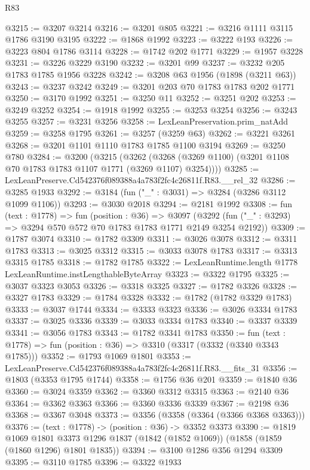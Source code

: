 \begin{lexlean}{R83}
\begin{coremodule}
@3215 := @3207 @3214
@3216 := @3201 @805
@3221 := @3216 @1111 @3115 @1786 @3190 @3195
@3222 := @1868 @1992
@3223 := @3222 @193
@3226 := @3223 @804 @1786 @3114
@3228 := @1742 @202 @1771
@3229 := @1957 @3228
@3231 := @3226 @3229 @3190
@3232 := @3201 @99
@3237 := @3232 @205 @1783 @1785 @1956 @3228
@3242 := @3208 @63 @1956 (@1898 (@3211 @63))
@3243 := @3237 @3242
@3249 := @3201 @203 @70 @1783 @1783 @202 @1771
@3250 := @3170 @1992
@3251 := @3250 @11
@3252 := @3251 @202
@3253 := @3249 @3252
@3254 := @1918 @1992
@3255 := @3253 @3254
@3256 := @3243 @3255
@3257 := @3231 @3256
@3258 := LexLeanPreservation.prim_natAdd
@3259 := @3258 @1795
@3261 := @3257 (@3259 @63)
@3262 := @3221 @3261
@3268 := @3201 @1101 @1110 @1783 @1785 @1100 @3194
@3269 := @3250 @780
@3284 := @3200
    (@3215
      (@3262 (@3268 (@3269 @1100) (@3201 @1108 @70 @1783 @1783 @1107 @1771 (@3269 @1107) @3254))))
@3285 := LexLeanPreserve.Cd542376f089388a4a783f2fc4c26811f.R83.__rel_32
@3286 := @3285 @1933
@3292 := @3184 (fun ("_" : @3031) => @3284 (@3286 @3112 @1099 @1106))
@3293 := @3030 @2018
@3294 := @2181 @1992
@3308 := fun (text : @1778) =>
  fun (position : @36) =>
  @3097 (@3292 (fun ("_" : @3293) => @3294 @570 @572 @70 @1783 @1783 @1771 @2149 @3254 @2192))
@3309 := @1787 @3074
@3310 := @1782 @3309
@3311 := @3026 @3078
@3312 := @3311 @1783
@3313 := @3025 @3312
@3315 := @3033 @3078 @1783
@3317 := @3313 @3315 @1785
@3318 := @1782 @1785
@3322 := LexLeanRuntime.length @1778 LexLeanRuntime.instLengthableByteArray
@3323 := @3322 @1795
@3325 := @3037 @3323 @3053
@3326 := @3318 @3325
@3327 := @1782 @3326
@3328 := @3327 @1783
@3329 := @1784 @3328
@3332 := @1782 (@1782 @3329 @1783)
@3333 := @3037 @1744
@3334 := @3333 @3323
@3336 := @3026 @3334 @1783
@3337 := @3025 @3336
@3339 := @3033 @3334 @1783
@3340 := @3337 @3339
@3341 := @3056 @1783
@3343 := @1782 @3341 @1783
@3350 := fun (text : @1778) => fun (position : @36) => @3310 (@3317 (@3332 (@3340 @3343 @1785)))
@3352 := @1793 @1069 @1801
@3353 := LexLeanPreserve.Cd542376f089388a4a783f2fc4c26811f.R83.__fits_31
@3356 := @1803 (@3353 @1795 @1744)
@3358 := @1756 @36 @201
@3359 := @1840 @36
@3360 := @3024 @3359
@3362 := @3360 @3312 @3315
@3363 := @2140 @36
@3364 := @3362 @3363
@3366 := @3360 @3336 @3339
@3367 := @2198 @36
@3368 := @3367 @3048
@3373 := @3356 (@3358 (@3364 (@3366 @3368 @3363)))
@3376 := (text : @1778) -> (position : @36) -> @3352 @3373
@3390 := @1819
    @1069
    @1801
    @3373
    @1296
    @1837
    (@1842 (@1852 @1069))
    (@1858 (@1859 (@1860 @1296) @1801 @1835))
@3394 := @3100 @1286 @356 @1294 @3309
@3395 := @3110 @1785
@3396 := @3322 @1933

\end{coremodule}
\end{lexlean}

